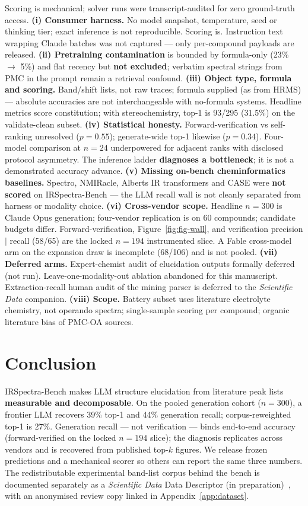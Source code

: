 \documentclass{article}
\begin{document}
Scoring is mechanical; solver runs were transcript-audited for zero ground-truth access.
\textbf{(i) Consumer harness.} No model snapshot, temperature, seed or thinking tier; exact
inference is not reproducible. Scoring is. Instruction text wrapping Claude batches was not
captured --- only per-compound payloads are released.
\textbf{(ii) Pretraining contamination} is bounded by formula-only (23\% $\to$ 5\%) and flat
recency but \textbf{not excluded}; verbatim spectral strings from PMC in the prompt remain a
retrieval confound.
\textbf{(iii) Object type, formula and scoring.} Band/shift lists, not raw traces; formula
supplied (as from HRMS) --- absolute accuracies are not interchangeable with no-formula
systems. Headline metrics score constitution; with stereochemistry, top-1 is 93/295 (31.5\%)
on the validate-clean subset.
\textbf{(iv) Statistical honesty.} Forward-verification vs self-ranking unresolved ($p{=}0.55$);
generate-wide top-1 likewise ($p{=}0.34$). Four-model comparison at $n{=}24$ underpowered for
adjacent ranks with disclosed protocol asymmetry. The inference ladder \textbf{diagnoses a
bottleneck}; it is not a demonstrated accuracy advance.
\textbf{(v) Missing on-bench cheminformatics baselines.} Spectro, NMIRacle, Alberts IR
transformers and CASE were \textbf{not scored} on IRSpectra-Bench --- the LLM recall wall is
not cleanly separated from harness or modality choice.
\textbf{(vi) Cross-vendor scope.} Headline $n{=}300$ is Claude Opus generation; four-vendor
replication is on 60 compounds; candidate budgets differ.
Forward-verification, Figure~\ref{fig:fig-wall}, and verification precision $|$ recall (58/65)
are the locked $n{=}194$ instrumented slice.
A Fable cross-model arm on the expansion draw is incomplete (68/106) and is not pooled.
\textbf{(vii) Deferred arms.} Expert-chemist audit of elucidation outputs formally deferred
(not run). Leave-one-modality-out ablation abandoned for this manuscript. Extraction-recall
human audit of the mining parser is deferred to the \textit{Scientific Data} companion.
\textbf{(viii) Scope.} Battery subset uses literature electrolyte chemistry, not operando
spectra; single-sample scoring per compound; organic literature bias of PMC-OA sources.

\section{Conclusion}
\label{sec:conclusion}

IRSpectra-Bench makes LLM structure elucidation from literature peak lists \textbf{measurable
and decomposable}.
On the pooled generation cohort ($n{=}300$), a frontier LLM recovers 39\% top-1 and 44\%
generation recall; corpus-reweighted top-1 is 27\%.
Generation recall --- not verification --- binds end-to-end accuracy (forward-verified on
the locked $n{=}194$ slice); the diagnosis replicates across
vendors and is recovered from published top-$k$ figures.
We release frozen predictions and a mechanical scorer so others can report the same three
numbers.
The redistributable experimental band-list corpus behind the bench is documented separately
as a \textit{Scientific Data} Data Descriptor (in preparation)~\citep{yabbarov2026irexp}, with an
anonymised review copy linked in Appendix~\ref{app:dataset}.
\end{document}
